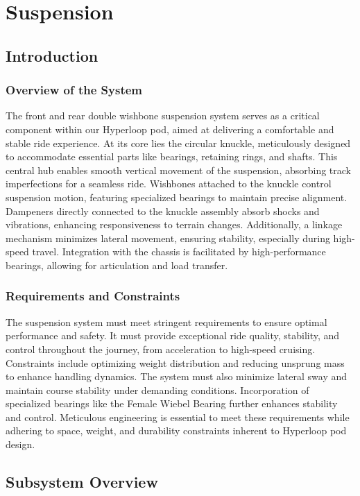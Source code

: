
\section{Suspension}

\subsection{Introduction}
\subsubsection{Overview of the System}
The front and rear double wishbone suspension system serves as a critical component within our Hyperloop pod, aimed at delivering a comfortable and stable ride experience. At its core lies the circular knuckle, meticulously designed to accommodate essential parts like bearings, retaining rings, and shafts. This central hub enables smooth vertical movement of the suspension, absorbing track imperfections for a seamless ride. Wishbones attached to the knuckle control suspension motion, featuring specialized bearings to maintain precise alignment. Dampeners directly connected to the knuckle assembly absorb shocks and vibrations, enhancing responsiveness to terrain changes. Additionally, a linkage mechanism minimizes lateral movement, ensuring stability, especially during high-speed travel. Integration with the chassis is facilitated by high-performance bearings, allowing for articulation and load transfer.

\subsubsection{Requirements and Constraints}
The suspension system must meet stringent requirements to ensure optimal performance and safety. It must provide exceptional ride quality, stability, and control throughout the journey, from acceleration to high-speed cruising. Constraints include optimizing weight distribution and reducing unsprung mass to enhance handling dynamics. The system must also minimize lateral sway and maintain course stability under demanding conditions. Incorporation of specialized bearings like the Female Wiebel Bearing further enhances stability and control. Meticulous engineering is essential to meet these requirements while adhering to space, weight, and durability constraints inherent to Hyperloop pod design.

\newpage
\subsection{Subsystem Overview}
